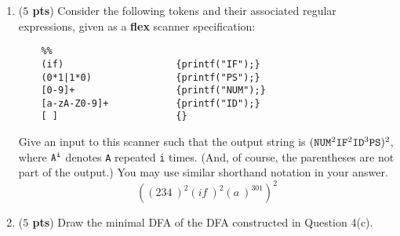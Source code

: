 \documentclass[10pt]{article}
\newcommand {\pts}[1]{({\bf #1 pts})}
\begin{document}
\begin{enumerate}
\begin{tikzpicture}[shorten >=1pt,node distance=2cm,on grid,auto]
	\end{tikzpicture}

  \newpage
   \item \pts{$5$} Consider the following tokens and their associated regular expressions, given as a \textbf{flex} scanner specification:

  \begin{lstlisting}
	%%
	(if)                    {printf("IF");}
	(0*1|1*0)               {printf("PS");}
	[0-9]+                  {printf("NUM");}
	[a-zA-Z0-9]+            {printf("ID");}
	[ ]                     {}
  \end{lstlisting}

  Give an input to this scanner such that the output string is $\tt (NUM^{\rm 2} IF^{\rm 2} ID^{\rm 3} PS)^{\rm 2}$, where $\tt A^i$ denotes {\tt A} repeated {\tt i} times.   (And, of course, the parentheses are not part of the output.)  You may use similar shorthand notation in your answer.
  \[
	((234\ )^2(if\ )^2(a\ )^301)^2
  \]

  \newpage
  \item \pts{$5$} Draw the minimal DFA of the DFA constructed in Question 4(c).
   \\
	\\
	\begin{tikzpicture}[shorten >=1pt,node distance=2cm,on grid,auto]
	\end{tikzpicture}

\end{enumerate}
\end{document}

